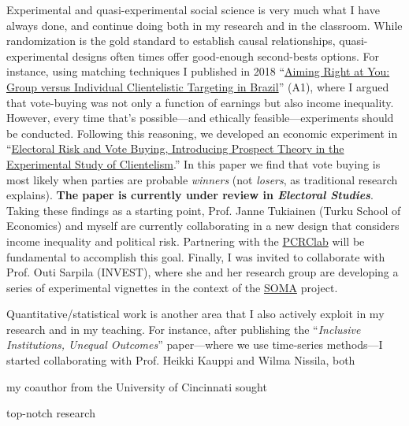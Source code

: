 \documentclass[10pt,stdletter,dateno,sigleft]{newlfm} %
\begin{document}
\begin{newlfm}
Experimental and quasi-experimental social science is very much what I have always done, and continue doing both in my research and in the classroom. While randomization is the gold standard to establish causal relationships, quasi-experimental designs often times offer good-enough second-bests options. For instance, using matching techniques I published in 2018 ``\href{https://journals.sub.uni-hamburg.de/giga/jpla/article/view/1121/1128}{Aiming Right at You: Group versus Individual Clientelistic Targeting in Brazil}'' (A1), where I argued that vote-buying was not only a function of earnings but also income inequality. However, every time that's possible---and ethically feasible---experiments should be conducted. Following this reasoning, we developed an economic experiment in ``\href{https://github.com/hbahamonde/Economic_Experiment_Vote_Selling/raw/master/abstract.txt}{Electoral Risk and Vote Buying, Introducing Prospect Theory in the Experimental Study of Clientelism}.'' In this paper we find that vote buying is most likely when parties are probable \emph{winners} (not \emph{losers}, as traditional research explains). {\bf The paper is currently under review in \emph{Electoral Studies}}. Taking these findings as a starting point, Prof. Janne Tukiainen (Turku School of Economics) and myself are currently collaborating in a new design that considers income inequality and political risk. Partnering with the \href{https://pcrclab.utu.fi/?page_id=894&lang=en}{PCRClab} will be fundamental to accomplish this goal. Finally, I was invited to collaborate with Prof. Outi Sarpila (INVEST), where she and her research group are developing a series of experimental vignettes in the context of the \href{https://soma.utu.fi}{SOMA} project.

Quantitative/statistical work is another area that I also actively exploit in my research and in my teaching. For instance, after publishing the ``\emph{Inclusive Institutions, Unequal Outcomes}'' paper---where we use time-series methods---I started collaborating with Prof. Heikki Kauppi and Wilma Nissila, both 

my coauthor from the University of Cincinnati sought 


top-notch research


\end{newlfm}
\end{document}
